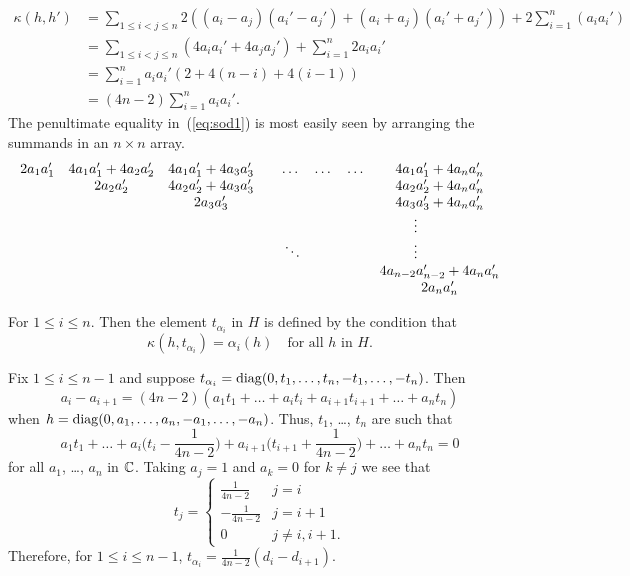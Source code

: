 \begin{equation}
  \label{eq:sod1}
  \begin{aligned}
    \kappa(h,h')&= \sum_{1\leq i<j\leq n} 2\left( (a_i-a_j)(a_i'-a_j') +
      (a_i+a_j)(a_i'+a_j') \right) +2\sum_{i=1}^n \left( a_ia_i' \right)\\
    &= \sum_{1\leq i<j \leq n} (4a_ia_i' +4a_ja_j') +\sum_{i=1}^n 2a_ia_i'
    \\
    &= \sum_{i=1}^n a_ia_i' (2+4(n-i) +4(i-1))\\
    &=(4n-2) \sum_{i=1}^n a_ia_i'.
  \end{aligned}
\end{equation}
The penultimate equality in~(\ref{eq:sod1}) is most easily seen by arranging
the summands in an $n\times n$ array.
\[
\begin{array}{cccrrrrc}
  2a_1a_1'&4a_1a_1'+ 4a_2a_2'&4a_1a_1'+
  4a_3a_3'&&\dots&\dots&\dots&4a_{1}a_{1}'+ 4a_na_n' \\  
  &2a_2a_2'&4a_2a_2'+4a_3a_3'&&&&&4a_{2}a_{2}'+ 4a_na_n' \\
  &&2a_3a_3'&&&&&4a_{3}a_{3}'+ 4a_na_n' \\
  &&&&&&&\vdots\hphantom{+4a_na_n'}\\
  &&&&\ddots&&&\vdots\hphantom{+4a_na_n'}\\
  &&&&&&&4a_{n-2}a_{n-2}'+ 4a_na_n' \\ 
  &&&&&&&2a_na_n'
\end{array}
\]

For $1\leq i\leq n$. Then the element $t_{\alpha_i}$ in $H$ is defined by
the condition that
\[
\kappa(h, t_{\alpha_i}) = \alpha_i(h) \quad \text{for all $h$ in $H$.}
\]

Fix $1\leq i\leq n-1$ and suppose $t_{\alpha_i}= {\operatorname{diag}(0,t_1,\dots,t_n,
  -t_1,\dots,-t_n)}$. Then
\begin{equation*}
  a_i-a_{i+1}= (4n-2)(a_1t_1+\dots+a_it_i+a_{i+1}t_{i+1}+ \dots +a_nt_n)
\end{equation*}
when $h={\operatorname{diag}(0,a_1,\dots,a_n, -a_1,\dots,-a_n)}$. Thus, $t_1$, \dots, $t_n$ are such that
\begin{equation*}
  \textstyle a_1t_1+\dots+a_i\big(t_i- \frac 1{4n-2} \big) +a_{i+1}
  \big(t_{i+1} +\frac 1{4n-2} \big)+  \dots +a_nt_n=0 
\end{equation*}
for all $a_1$, \dots, $a_n$ in ${\mathbb C}$. Taking $a_j=1$ and $a_k=0$ for $k\ne
j$ we see that
\[
t_j= \begin{cases} \textstyle \frac 1{4n-2}&j=i \\ -\frac 1{4n-2} &j=i+1 \\0
  &j\ne i, i+1. \end{cases}
\]
Therefore, for $1\leq i\leq n-1$, $t_{\alpha_i}=\frac 1{4n-2}( d_i-
d_{i+1})$.

